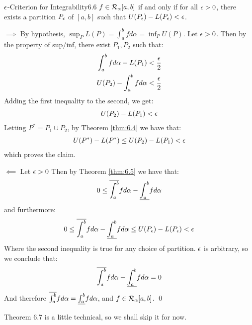 \begin{theorem}{\texorpdfstring{$\epsilon$}{e}-Criterion for Integrability}{6.6}
    $f \in \mathcal{R}_\alpha[a, b]$ if and only if for all $\epsilon > 0$, there exists a partition $P_\epsilon$ of $[a, b]$ such that $U(P_\epsilon) - L(P_\epsilon) < \epsilon$. 
\end{theorem}
\begin{nproof}
    $\boxed{\implies}$ By hypothesis, $\sup_P L(P) = \int_a^b fd\alpha = \inf_P U(P)$. Let $\epsilon > 0$. Then by the property of sup/inf, there exist $P_1, P_2$ such that:
    \begin{align*}
        \int_a^b f d\alpha - L(P_1) &< \frac{\epsilon}{2}
        \\ U(P_2) - \int_a^b f d\alpha &< \frac{\epsilon}{2}
    \end{align*}
    Adding the first inequality to the second, we get:
    \begin{align*}
        U(P_2) - L(P_1) < \epsilon
    \end{align*}
    Letting $P^* = P_1\cup P_2$, by Theorem \ref{thm:6.4} we have that:
    \begin{align*}
        U(P^*) - L(P^*) \leq U(P_2) - L(P_1) < \epsilon
    \end{align*}
    which proves the claim.

    $\boxed{\impliedby}$ Let $\epsilon > 0$ Then by Theorem \ref{thm:6.5} we have that:
    \begin{align*}
        0 \leq \overline{\int_{a}^{b}} f d\alpha - \underline{\int_{a}^{b}} f d\alpha
    \end{align*}
    and furthermore:
    \begin{align*}
        0 \leq \overline{\int_{a}^{b}} f d\alpha - \underline{\int_{a}^{b}} f d\alpha \leq U(P_\epsilon) - L(P_\epsilon) < \epsilon
    \end{align*}
    Where the second inequality is true for any choice of partition. $\epsilon$ is arbitrary, so we conclude that:
    \begin{align*}
        \overline{\int_{a}^{b}} f d\alpha - \underline{\int_{a}^{b}} f d\alpha = 0
    \end{align*}
    And therefore $\overline{\int_{a}^{b}} f d\alpha = \underline{\int_{a}^{b}} f d\alpha$, and $f \in \mathcal{R}_\alpha[a, b]$. \qed
\end{nproof}

\noindent Theorem 6.7 is a little technical, so we shall skip it for now.

